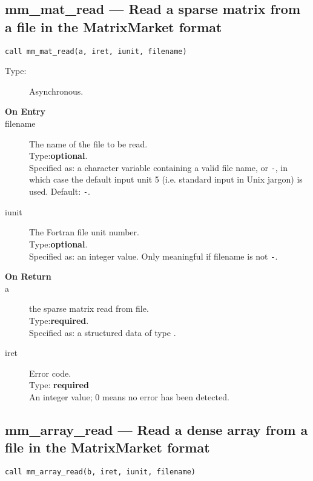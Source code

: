 \clearpage\subsection*{mm\_mat\_read --- Read a sparse matrix from a
  file in the MatrixMarket format}

\begin{lstlisting}
call mm_mat_read(a, iret, iunit, filename)
\end{lstlisting}

\begin{description}
\item[Type:] Asynchronous.
\item[\bf  On Entry ]
\item[filename] The name of the file to be read.\\
Type:{\bf optional}.\\
Specified as: a character variable containing a valid file name, or
\verb|-|, in which case the default input unit  5 (i.e. standard input
in Unix jargon) is used. Default: \verb|-|. 
\item[iunit] The Fortran file unit number.\\
Type:{\bf optional}.\\
Specified as: an integer value. Only meaningful if filename is not \verb|-|.
\end{description}

\begin{description}
\item[\bf On Return]
\item[a] the sparse matrix read from file.\\
Type:{\bf required}.\\
Specified as: a structured data of type \spdata.
\item[iret] Error code.\\
Type: {\bf required} \\
An integer value; 0 means no error has been detected. 
\end{description}


\clearpage\subsection*{mm\_array\_read --- Read a dense array from a
  file in the MatrixMarket format}

\begin{lstlisting}
call mm_array_read(b, iret, iunit, filename)
\end{lstlisting}

